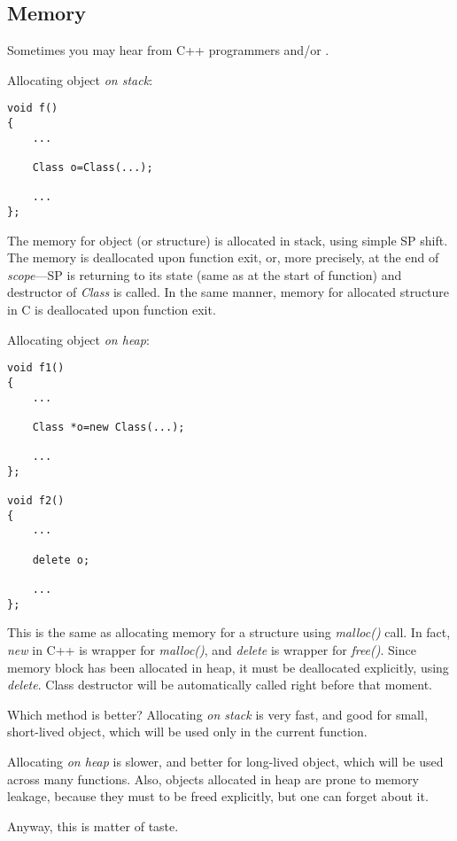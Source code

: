 \subsection{Memory}

Sometimes you may hear from C++ programmers  and/or .

Allocating object \emph{on stack}:

\begin{lstlisting}[style=customc]
void f()
{
	...

	Class o=Class(...);

	...
};
\end{lstlisting}

The memory for object (or structure) is allocated in stack, using simple \ac{SP} shift.
The memory is deallocated upon function exit, or, more precisely, at the end of \emph{scope}---\ac{SP} is returning to its state (same as at the start of function) and destructor of \emph{Class} is called.
In the same manner, memory for allocated structure in C is deallocated upon function exit.

Allocating object \emph{on \gls{heap}}:

\begin{lstlisting}[style=customc]
void f1()
{
	...

	Class *o=new Class(...);

	...
};

void f2()
{
	...

	delete o;

	...
};
\end{lstlisting}

This is the same as allocating memory for a structure using \emph{malloc()} call.
In fact, \emph{new} in C++ is wrapper for \emph{malloc()}, and \emph{delete} is wrapper for \emph{free()}.
Since memory block has been allocated in \gls{heap}, it must be deallocated explicitly, using \emph{delete}.
Class destructor will be automatically called right before that moment.

Which method is better?
Allocating \emph{on stack} is very fast, and good for small, short-lived object, which will be used only in the current function.

Allocating \emph{on heap} is slower, and better for long-lived object, which will be used across many functions.
Also, objects allocated in \gls{heap} are prone to memory leakage, because they must to be freed explicitly, but one can
forget about it.

Anyway, this is matter of taste.
